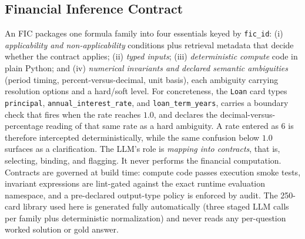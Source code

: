 \documentclass[sigconf,anonymous]{acmart}
\begin{document}
\subsection{Financial Inference Contract}
An FIC packages one formula family into four essentials keyed by \texttt{fic\_id}: (i) \emph{applicability and non-applicability} conditions plus retrieval metadata that decide whether the contract applies; (ii) \emph{typed inputs}; (iii) \emph{deterministic compute} code in plain Python; and (iv) \emph{numerical invariants and declared semantic ambiguities} (period timing, percent-versus-decimal, unit basis), each ambiguity carrying resolution options and a hard/soft level.
For concreteness, the \texttt{Loan} card types \texttt{principal}, \texttt{annual\_interest\_rate}, and \texttt{loan\_term\_years}, carries a boundary check that fires when the rate reaches $1.0$, and declares the decimal-versus-percentage reading of that same rate as a hard ambiguity. A rate entered as $6$ is therefore intercepted deterministically, while the same confusion below $1.0$ surfaces as a clarification.
The LLM's role is \emph{mapping into contracts}, that is, selecting, binding, and flagging. It never performs the financial computation.
Contracts are governed at build time: compute code passes execution smoke tests, invariant expressions are lint-gated against the exact runtime evaluation namespace, and a pre-declared output-type policy is enforced by audit.
The 250-card library used here is generated fully automatically (three staged LLM calls per family plus deterministic normalization) and never reads any per-question worked solution or gold answer.
\end{document}
